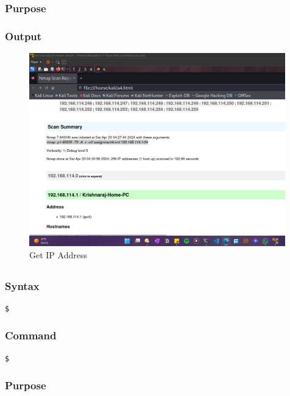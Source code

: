 \documentclass[11pt]{article}
\begin{document}
\subsubsection*{Purpose}

\subsubsection*{Output}
\begin{figure}[H]
    \centering
    \includegraphics[width=0.99\textwidth]{a4 (6).png}
    \caption{Get IP Address}
    \label{fig:1}
\end{figure}
\subsection{}

\subsubsection*{Syntax}
\begin{verbatim}
$
\end{verbatim}

\subsubsection*{Command}
\begin{verbatim}
$
\end{verbatim}

\subsubsection*{Purpose}
\end{document}
